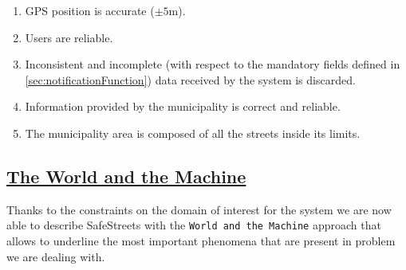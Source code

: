 	\begin{enumerate}[label=\textbf{DA\arabic*}]
		\item GPS position is accurate ($\pm5$m).
		\item Users are reliable.
		\item Inconsistent and incomplete (with respect to the mandatory fields defined in \ref{sec:notificationFunction}) data received by the system is discarded.
		\item Information provided by the municipality is correct and reliable.
		\item The municipality area is composed of all the streets inside its limits.
	\end{enumerate} 
	
\subsection[The World and the Machine]{\hyperlink{toc}{The World and the Machine}}
	Thanks to the constraints on the domain of interest for the system we are now able to describe SafeStreets with the \texttt{World and the Machine} approach that allows to underline the most important phenomena that are present in problem we are dealing with. 
	